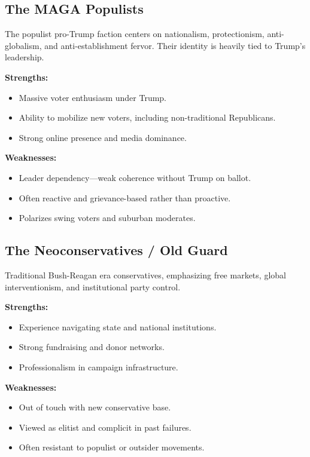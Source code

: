 \subsection{The MAGA Populists}
The populist pro-Trump faction centers on nationalism, protectionism, anti-globalism, and anti-establishment fervor. Their identity is heavily tied to Trump’s leadership.

\textbf{Strengths:}
\begin{itemize}
\item Massive voter enthusiasm under Trump.
\item Ability to mobilize new voters, including non-traditional Republicans.
\item Strong online presence and media dominance.
\end{itemize}

\textbf{Weaknesses:}
\begin{itemize}
\item Leader dependency—weak coherence without Trump on ballot.
\item Often reactive and grievance-based rather than proactive.
\item Polarizes swing voters and suburban moderates.
\end{itemize}

\subsection{The Neoconservatives / Old Guard}
Traditional Bush-Reagan era conservatives, emphasizing free markets, global interventionism, and institutional party control.

\textbf{Strengths:}
\begin{itemize}
\item Experience navigating state and national institutions.
\item Strong fundraising and donor networks.
\item Professionalism in campaign infrastructure.
\end{itemize}

\textbf{Weaknesses:}
\begin{itemize}
\item Out of touch with new conservative base.
\item Viewed as elitist and complicit in past failures.
\item Often resistant to populist or outsider movements.
\end{itemize}

